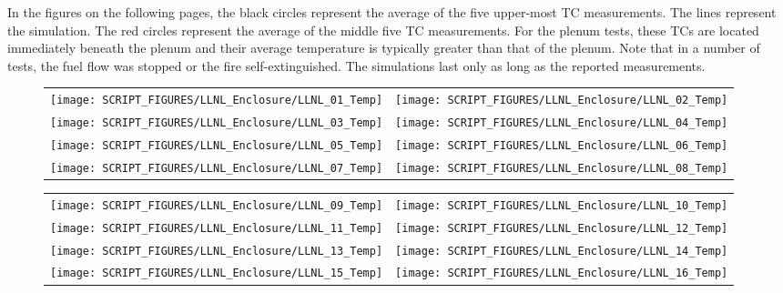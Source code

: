 In the figures on the following pages, the black circles represent the average of the five upper-most TC measurements. The lines represent the simulation. The red circles represent the average of the middle five TC measurements. For the plenum tests, these TCs are located immediately beneath the plenum and their average temperature is typically greater than that of the plenum. Note that in a number of tests, the fuel flow was stopped or the fire self-extinguished. The simulations last only as long as the reported measurements.

\begin{figure}[p]
\begin{tabular*}{\textwidth}{l@{\extracolsep{\fill}}r}
\texttt{[image: SCRIPT\_FIGURES/LLNL\_Enclosure/LLNL\_01\_Temp]} &
\texttt{[image: SCRIPT\_FIGURES/LLNL\_Enclosure/LLNL\_02\_Temp]} \\
\texttt{[image: SCRIPT\_FIGURES/LLNL\_Enclosure/LLNL\_03\_Temp]} &
\texttt{[image: SCRIPT\_FIGURES/LLNL\_Enclosure/LLNL\_04\_Temp]} \\
\texttt{[image: SCRIPT\_FIGURES/LLNL\_Enclosure/LLNL\_05\_Temp]} &
\texttt{[image: SCRIPT\_FIGURES/LLNL\_Enclosure/LLNL\_06\_Temp]} \\
\texttt{[image: SCRIPT\_FIGURES/LLNL\_Enclosure/LLNL\_07\_Temp]} &
\texttt{[image: SCRIPT\_FIGURES/LLNL\_Enclosure/LLNL\_08\_Temp]}
\end{tabular*}
\label{LLNL_Enclosure_Temp_1}
\end{figure}

\begin{figure}[p]
\begin{tabular*}{\textwidth}{l@{\extracolsep{\fill}}r}
\texttt{[image: SCRIPT\_FIGURES/LLNL\_Enclosure/LLNL\_09\_Temp]} &
\texttt{[image: SCRIPT\_FIGURES/LLNL\_Enclosure/LLNL\_10\_Temp]} \\
\texttt{[image: SCRIPT\_FIGURES/LLNL\_Enclosure/LLNL\_11\_Temp]} &
\texttt{[image: SCRIPT\_FIGURES/LLNL\_Enclosure/LLNL\_12\_Temp]} \\
\texttt{[image: SCRIPT\_FIGURES/LLNL\_Enclosure/LLNL\_13\_Temp]} &
\texttt{[image: SCRIPT\_FIGURES/LLNL\_Enclosure/LLNL\_14\_Temp]} \\
 \texttt{[image: SCRIPT\_FIGURES/LLNL\_Enclosure/LLNL\_15\_Temp]} &
\texttt{[image: SCRIPT\_FIGURES/LLNL\_Enclosure/LLNL\_16\_Temp]}
\end{tabular*}
\label{LLNL_Enclosure_Temp_2}
\end{figure}

